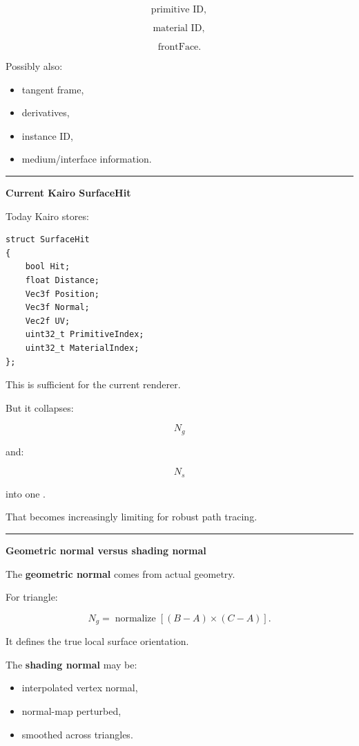 \[
\text{primitive ID},
\]

\[
\text{material ID},
\]

\[
\text{frontFace}.
\]

Possibly also:

\begin{itemize}
\tightlist
\item
  tangent frame,
\item
  derivatives,
\item
  instance ID,
\item
  medium/interface information.
\end{itemize}

\begin{center}\rule{0.5\linewidth}{0.5pt}\end{center}

\textbf{Current Kairo SurfaceHit}

Today Kairo stores:

\begin{verbatim}
struct SurfaceHit
{
    bool Hit;
    float Distance;
    Vec3f Position;
    Vec3f Normal;
    Vec2f UV;
    uint32_t PrimitiveIndex;
    uint32_t MaterialIndex;
};
\end{verbatim}

This is sufficient for the current renderer.

But it collapses:

\[
N_g
\]

and:

\[
N_s
\]

into one .

That becomes increasingly limiting for robust path tracing.

\begin{center}\rule{0.5\linewidth}{0.5pt}\end{center}

\textbf{Geometric normal versus shading normal}

The \textbf{geometric normal} comes from actual geometry.

For triangle:

\[
\boxed{
N_g
=
\operatorname{normalize}
[
(B-A)\times(C-A)
].
}
\]

It defines the true local surface orientation.

The \textbf{shading normal} may be:

\begin{itemize}
\tightlist
\item
  interpolated vertex normal,
\item
  normal-map perturbed,
\item
  smoothed across triangles.
\end{itemize}

